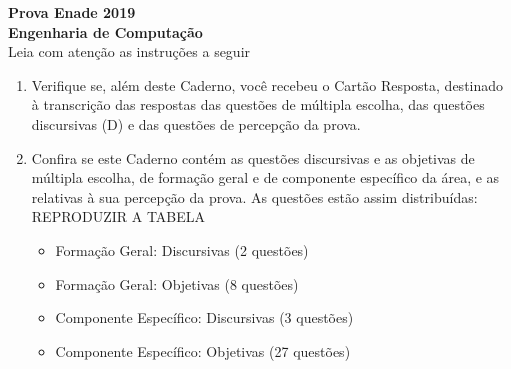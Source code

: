 \documentclass{exam}
\begin{document}
\begin{center}
\vspace*{1cm}
\LARGE \textbf{Prova Enade 2019\\Engenharia de Computação \\}
\vspace*{0.5cm}
\Large Leia com atenção as instruções a seguir
\vspace*{0.5cm}
\end{center}

\begin{enumerate}
    \item Verifique se, além deste Caderno, você recebeu o Cartão Resposta, destinado à transcrição das respostas das questões de múltipla escolha, das questões discursivas (D) e das questões de percepção da prova.
    \item Confira se este Caderno contém as questões discursivas e as objetivas de múltipla escolha, de formação geral e de componente específico da área, e as relativas à sua percepção da prova. As questões estão assim distribuídas:
REPRODUZIR A TABELA
    \begin{itemize}

        \item Formação Geral: Discursivas (2 questões)\\
        \item Formação Geral: Objetivas  (8 questões)\\
        \item Componente Específico: Discursivas (3 questões)\\
        \item Componente Específico: Objetivas (27 questões)\\
    \end{itemize}


\end{enumerate}
\end{document}
